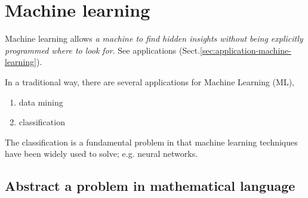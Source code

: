 
 

\chapter{Machine learning}
\label{sec:machine-learning}

Machine learning allows {\it a machine to find hidden insights without being
explicitly programmed where to look for}. See applications
(Sect.\ref{sec:application-machine-learning}).

In a traditional way, there are several applications for Machine Learning
(ML), 
\begin{enumerate}
  \item  data mining
   
  \item classification
\end{enumerate}

The classification is a fundamental problem in that machine learning techniques
have been widely used to solve;  e.g. neural networks. 


\section{Abstract a problem in mathematical language}

